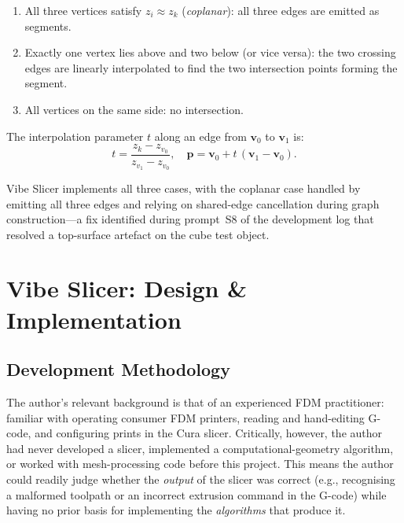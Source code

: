 \documentclass[10pt,twocolumn,a4paper]{article}
\begin{document}
\begin{enumerate}
  \item All three vertices satisfy $z_i \approx z_k$ (\emph{coplanar}):
        all three edges are emitted as segments.
  \item Exactly one vertex lies above and two below (or vice versa):
        the two crossing edges are linearly interpolated to find the
        two intersection points forming the segment.
  \item All vertices on the same side: no intersection.
\end{enumerate}

The interpolation parameter $t$ along an edge from $\mathbf{v}_0$
to $\mathbf{v}_1$ is:
\begin{equation}
  t = \frac{z_k - z_{v_0}}{z_{v_1} - z_{v_0}}, \quad
  \mathbf{p} = \mathbf{v}_0 + t\,(\mathbf{v}_1 - \mathbf{v}_0).
\end{equation}

Vibe Slicer implements all three cases, with the coplanar case
handled by emitting all three edges and relying on shared-edge
cancellation during graph construction—a fix identified during
prompt~S8 of the development log that resolved a top-surface
artefact on the cube test object.

\section{Vibe Slicer: Design \& Implementation}
\label{sec:design}

\subsection{Development Methodology}

The author's relevant background is that of an experienced FDM
practitioner: familiar with operating consumer FDM printers,
reading and hand-editing G-code, and configuring prints in the
Cura slicer. Critically, however, the author had never developed
a slicer, implemented a computational-geometry algorithm, or
worked with mesh-processing code before this project. This means
the author could readily judge whether the \emph{output} of the
slicer was correct (e.g., recognising a malformed toolpath or an
incorrect extrusion command in the G-code) while having no prior
basis for implementing the \emph{algorithms} that produce it.
\end{document}
